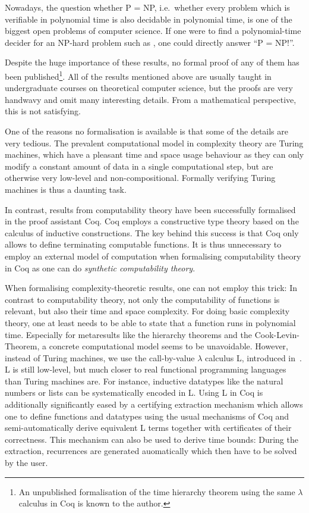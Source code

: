 Nowadays, the question whether P = NP, i.e.\ whether every problem which is verifiable in polynomial time is also decidable in polynomial time, is one of the biggest open problems of computer science\cite{TODO}. If one were to find a polynomial-time decider for an NP-hard problem such as \SAT{}, one could directly answer ``P = NP!''.  

Despite the huge importance of these results, no formal proof of any of them has been published\footnote{An unpublished formalisation of the time hierarchy theorem using the same $\lambda$ calculus in Coq is known to the author.}. All of the results mentioned above are usually taught in undergraduate courses on theoretical computer science, but the proofs are very handwavy and omit many interesting details. From a mathematical perspective, this is not satisfying.

One of the reasons no formalisation is available is that some of the details are very tedious. The prevalent computational model in complexity theory are Turing machines, which have a pleasant time and space usage behaviour as they can only modify a constant amount of data in a single computational step, but are otherwise very low-level and non-compositional\cite{TODO}. Formally verifying Turing machines is thus a daunting task\cite{TODO}.

In contrast, results from computability theory have been successfully formalised in the proof assistant Coq\cite{TODO}. Coq employs a constructive type theory based on the calculus of inductive constructions\cite{TODO}. The key behind this success is that Coq only allows to define terminating computable functions. It is thus unnecessary to employ an external model of computation when formalising computability theory in Coq as one can do \emph{synthetic computability theory}.

When formalising complexity-theoretic results, one can not employ this trick: In contrast to computability theory, not only the computability of functions is relevant, but also their time and space complexity. For doing basic complexity theory, one at least needs to be able to state that a function runs in polynomial time.
Especially for metaresults like the hierarchy theorems and the Cook-Levin-Theorem, a concrete computational model seems to be unavoidable.
However, instead of Turing machines, we use the call-by-value $\lambda$ calculus L, introduced in~\cite{TODO}. L is still low-level, but much closer to real functional programming languages than Turing machines are. For instance, inductive datatypes like the natural numbers or lists can be systematically encoded in L.
Using L in Coq is additionally significantly eased by a certifying extraction mechanism\cite{TODO} which allows one to define functions and datatypes using the usual mechanisms of Coq and semi-automatically derive equivalent L terms together with certificates of their correctness. This mechanism can also be used to derive time bounds: During the extraction, recurrences are generated auomatically which then have to be solved by the user. 

